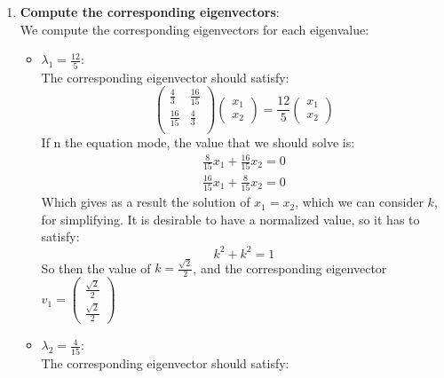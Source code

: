 \documentclass[12pt]{article}
\begin{document}
\begin{enumerate}
    \item \textbf{Compute the corresponding eigenvectors}:\\
    
    We compute the corresponding eigenvectors for each eigenvalue:
    \begin{itemize}
        \item \textbf{$\lambda_1=\frac{12}{5}$}:\\
        The corresponding eigenvector should satisfy:
        \begin{equation}
            \begin{pmatrix}
             \frac{4}{3} & \frac{16}{15} \\
              \frac{16}{15} &\frac{4}{3} \\
            \end{pmatrix}
            \begin{pmatrix}
                x_1 \\ x_2
            \end{pmatrix} = \frac{12}{5}
            \begin{pmatrix}
                x_1 \\ x_2
            \end{pmatrix}
        \end{equation}
        If n the equation mode, the value that we should solve is:
        \begin{equation}
            \begin{split}
                \frac{8}{15}x_1+\frac{16}{15}x_2=0 \\
                \frac{16}{15}x_1+\frac{8}{15}x_2=0
            \end{split}
        \end{equation}
        Which gives as a result the solution of $x_1=x_2$, which we can consider $k$, for simplifying. It is desirable to have a normalized value, so it has to satisfy:
        \begin{equation}
            k^2+k^2=1
        \end{equation}
        So then the value of $k=\frac{\sqrt{2}}{2}$, and the corresponding eigenvector $v_1=\begin{pmatrix}\frac{\sqrt{2}}{2} \\ \frac{\sqrt{2}}{2}\end{pmatrix}$
        \item \textbf{$\lambda_2=\frac{4}{15}$}:\\
        The corresponding eigenvector should satisfy:

\end{itemize}
\end{enumerate}
\end{document}

